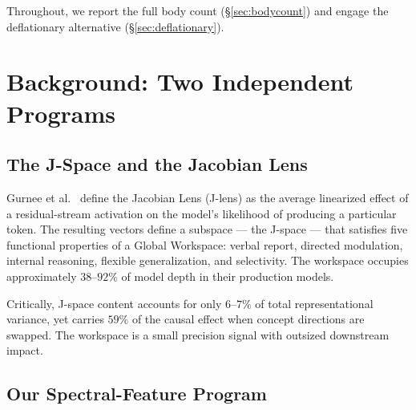 \documentclass[11pt,a4paper]{article}
\begin{document}
Throughout, we report the full body count (\S\ref{sec:bodycount}) and
engage the deflationary alternative (\S\ref{sec:deflationary}).
\section{Background: Two Independent Programs}
\label{sec:background}

\subsection{The J-Space and the Jacobian Lens}

Gurnee et al.~\citep{gurnee2026gwt} define the Jacobian Lens (J-lens)
as the average linearized effect of a residual-stream activation on
the model's likelihood of producing a particular token. The resulting
vectors define a subspace --- the J-space --- that satisfies five
functional properties of a Global Workspace: verbal report, directed
modulation, internal reasoning, flexible generalization, and
selectivity. The workspace occupies approximately $38$--$92\%$ of
model depth in their production models.

Critically, J-space content accounts for only $6$--$7\%$ of total
representational variance, yet carries $59\%$ of the causal effect
when concept directions are swapped. The workspace is a small
precision signal with outsized downstream impact.

\subsection{Our Spectral-Feature Program}
\label{sec:vproj}
\end{document}
